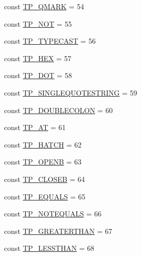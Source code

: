 \begin{DoxyCompactItemize}
\item 
const \hyperlink{class_smarty___internal___templateparser_ac02416d06a06f57b4bdcbb6021ea9194}{T\+P\+\_\+\+Q\+M\+A\+R\+K} = 54
\item 
const \hyperlink{class_smarty___internal___templateparser_a81300f46802f26bd96e2d53183ff5d09}{T\+P\+\_\+\+N\+O\+T} = 55
\item 
const \hyperlink{class_smarty___internal___templateparser_aa85ee617c019108bf5af35b267e474cb}{T\+P\+\_\+\+T\+Y\+P\+E\+C\+A\+S\+T} = 56
\item 
const \hyperlink{class_smarty___internal___templateparser_aa8c01ca463c50d95e216568d600b55f6}{T\+P\+\_\+\+H\+E\+X} = 57
\item 
const \hyperlink{class_smarty___internal___templateparser_ac76a5a223f045a6b8d9d8abb3bcd3713}{T\+P\+\_\+\+D\+O\+T} = 58
\item 
const \hyperlink{class_smarty___internal___templateparser_aa4f0fe59bb29c87e1b4c55c3ac66e76a}{T\+P\+\_\+\+S\+I\+N\+G\+L\+E\+Q\+U\+O\+T\+E\+S\+T\+R\+I\+N\+G} = 59
\item 
const \hyperlink{class_smarty___internal___templateparser_ab68e1d23f7ddb66c5e782d377a0384b7}{T\+P\+\_\+\+D\+O\+U\+B\+L\+E\+C\+O\+L\+O\+N} = 60
\item 
const \hyperlink{class_smarty___internal___templateparser_a2cae29f52f2e4da4be7fc9879617b6d5}{T\+P\+\_\+\+A\+T} = 61
\item 
const \hyperlink{class_smarty___internal___templateparser_a462a2034dc13d2f93637807166911c1a}{T\+P\+\_\+\+H\+A\+T\+C\+H} = 62
\item 
const \hyperlink{class_smarty___internal___templateparser_a0aecbba42d3bfea9110489b333f09260}{T\+P\+\_\+\+O\+P\+E\+N\+B} = 63
\item 
const \hyperlink{class_smarty___internal___templateparser_a25c272c1842bb280b4820d6c048d0edf}{T\+P\+\_\+\+C\+L\+O\+S\+E\+B} = 64
\item 
const \hyperlink{class_smarty___internal___templateparser_a461367fc93e3a20d9ba05dc76cba7c26}{T\+P\+\_\+\+E\+Q\+U\+A\+L\+S} = 65
\item 
const \hyperlink{class_smarty___internal___templateparser_a664c133cbfeaa6937627f5108fa1e9ec}{T\+P\+\_\+\+N\+O\+T\+E\+Q\+U\+A\+L\+S} = 66
\item 
const \hyperlink{class_smarty___internal___templateparser_aa5c7ab6bf9ffc3e89b850211d3c73c73}{T\+P\+\_\+\+G\+R\+E\+A\+T\+E\+R\+T\+H\+A\+N} = 67
\item 
const \hyperlink{class_smarty___internal___templateparser_a7088843cb5f2c3cfd28750d7bfc5816e}{T\+P\+\_\+\+L\+E\+S\+S\+T\+H\+A\+N} = 68

\end{DoxyCompactItemize}
